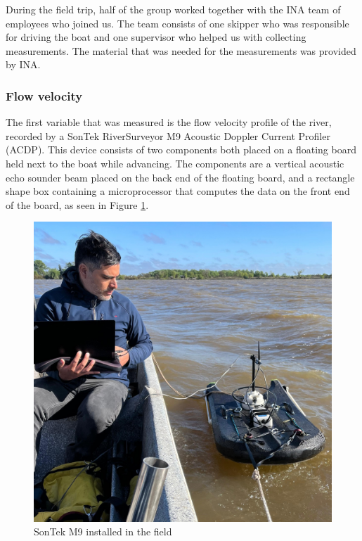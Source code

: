 
During the field trip, half of the group worked together with the INA team of employees who joined us. The team consists of one skipper who was responsible for driving the boat and one supervisor who helped us with collecting measurements. The material that was needed for the measurements was provided by INA. 


\subsubsection{Flow velocity}
The first variable that was measured is the flow velocity profile of the river, recorded by a SonTek RiverSurveyor M9 Acoustic Doppler Current Profiler (ACDP). This device consists of two components both placed on a floating board held next to the boat while advancing. The components are a vertical acoustic echo sounder beam placed on the back end of the floating board, and a rectangle shape box containing a microprocessor that computes the data on the front end of the board, as seen in Figure \ref{fig:SonTekmeasurement}.

\begin{figure}[H]
    \centering
    \includegraphics[width=0.5\linewidth]{figures/ch4/sonteknico.jpg}
    \caption{SonTek M9 installed in the field}
    \label{fig:SonTekmeasurement}
\end{figure}

